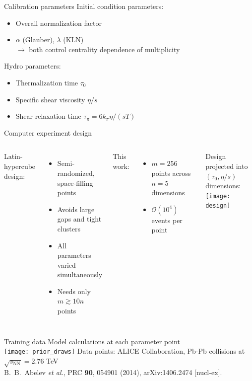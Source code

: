 \documentclass{beamer}
\newcommand{\order}[1]{$\mathcal O(10^{#1})$}
\begin{document}
\begin{frame}{Calibration parameters}
  Initial condition parameters:
  \begin{itemize}
    \item Overall normalization factor
    \item $\alpha$ (Glauber), $\lambda$ (KLN) \\
      $\rightarrow$ both control centrality dependence of multiplicity
  \end{itemize}
  \medskip
  Hydro parameters:
  \begin{itemize}
    \item Thermalization time $\tau_0$
    \item Specific shear viscosity $\eta/s$
    \item Shear relaxation time $\tau_\pi = 6k_\pi\eta/(sT)$ \enskip [vary $k_\pi$]
  \end{itemize}
\end{frame}


\begin{frame}{Computer experiment design}
  \begin{columns}
    Latin-hypercube design:
    \begin{itemize}
      \item Semi-randomized, space-filling points
      \item Avoids large gaps and tight clusters
      \item All parameters varied simultaneously
      \item Needs only $m \gtrsim 10n$ points
    \end{itemize}
    \smallskip
    This work:
    \begin{itemize}
      \item $m = 256$ points across $n = 5$ dimensions
      \item \order 4 events per point
    \end{itemize}

    \small
    Design projected into $(\tau_0, \eta/s)$ dimensions: \\[1em]
    \texttt{[image: design]}
  \end{columns}
\end{frame}


\begin{frame}{Training data}
  \bigskip
  \centering
  Model calculations at each parameter point \\
  \bigskip
  \texttt{[image: prior\_draws]}
  \flushright
  \tiny
  Data points: ALICE Collaboration, Pb-Pb collisions at $\sqrt{s_\text{NN}} = 2.76$ TeV \\
  B.~B.~Abelev {\it et al.}, PRC {\bf 90}, 054901 (2014), arXiv:1406.2474 [nucl-ex].
\end{frame}
\end{document}
